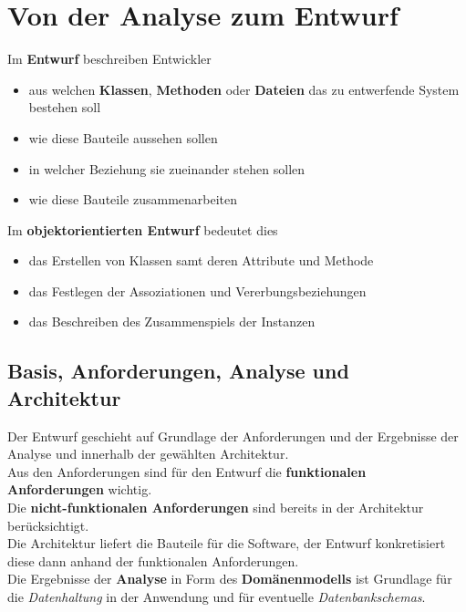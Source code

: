 \section{Von der Analyse zum Entwurf}

\noindent
Im \textbf{Entwurf} beschreiben Entwickler


\begin{itemize}
    \item aus welchen \textbf{Klassen}, \textbf{Methoden} oder \textbf{Dateien} das zu entwerfende System bestehen soll
    \item wie diese Bauteile aussehen sollen
    \item in welcher Beziehung sie zueinander stehen sollen
    \item wie diese Bauteile zusammenarbeiten
\end{itemize}

\noindent
Im \textbf{objektorientierten Entwurf} bedeutet dies

\begin{itemize}
    \item das Erstellen von Klassen samt deren Attribute und Methode
    \item das Festlegen der Assoziationen und Vererbungsbeziehungen
    \item das Beschreiben des Zusammenspiels der Instanzen
\end{itemize}

\subsection*{Basis, Anforderungen, Analyse und Architektur}
Der Entwurf geschieht auf Grundlage der Anforderungen und der Ergebnisse der Analyse und innerhalb der gewählten Architektur.\\

\noindent
Aus den Anforderungen sind für den Entwurf die \textbf{funktionalen Anforderungen} wichtig.\\
Die \textbf{nicht-funktionalen Anforderungen} sind bereits in der Architektur berücksichtigt.\\

\noindent
Die Architektur liefert die Bauteile für die Software, der Entwurf konkretisiert diese dann anhand der funktionalen Anforderungen.\\

\noindent
Die Ergebnisse der \textbf{Analyse} in Form des \textbf{Domänenmodells} ist Grundlage für die \textit{Datenhaltung} in der Anwendung und für eventuelle \textit{Datenbankschemas}.\\

